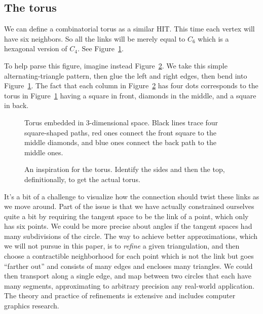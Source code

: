 \subsection{The torus}

We can define a combinatorial torus as a similar HIT. This time each vertex will have six neighbors. So all the links will be merely equal to \( C_6 \) which is a hexagonal version of \( C_4 \). See Figure~\ref{fig:torus}. 

To help parse this figure, imagine instead Figure~\ref{fig:flattorus}. We take this simple alternating-triangle pattern, then glue the left and right edges, then bend into Figure~\ref{fig:torus}. The fact that each column in Figure~\ref{fig:flattorus} has four dots corresponds to the torus in Figure~\ref{fig:torus} having a square in front, diamonds in the middle, and a square in back.

\begin{figure}[htbp]
\centering

\caption{Torus embedded in 3-dimensional space. Black lines trace four square-shaped paths, red ones connect the front square to the middle diamonds, and blue ones connect the back path to the middle ones.}
\label{fig:torus}
\end{figure}

\begin{figure}[htbp]
\centering

\caption{An inspiration for the torus. Identify the sides and then the top, definitionally, to get the actual torus.}
\label{fig:flattorus}
\end{figure}

It's a bit of a challenge to visualize how the connection should twist these links as we move around. Part of the issue is that we have actually constrained ourselves quite a bit by requiring the tangent space to be the link of a point, which only has six points. We could be more precise about angles if the tangent spaces had many subdivisions of the circle. The way to achieve better approximations, which we will not pursue in this paper, is to \emph{refine} a given triangulation, and then choose a contractible neighborhood for each point which is not the link but goes ``farther out'' and consists of many edges and encloses many triangles. We could then transport along a single edge, and map between two circles that each have many segments, approximating to arbitrary precision any real-world application. The theory and practice of refinements is extensive and includes computer graphics research.

